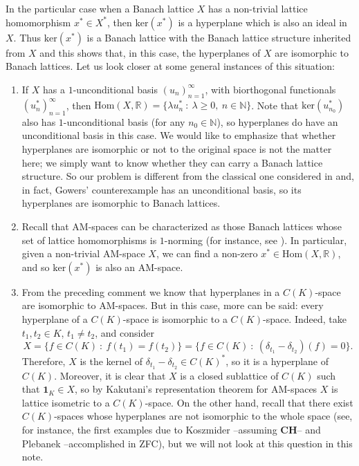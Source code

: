 \documentclass[11pt]{amsart}
\theoremstyle{definition}
\numberwithin{equation}{section}
\begin{document}
In the particular case when a Banach lattice $X$ has a non-trivial lattice homomorphism $x^*\in X^*$, then $\text{ker}(x^*)$ is a hyperplane which is also an ideal in $X$. Thus $\text{ker}(x^*)$ is a Banach lattice with the Banach lattice structure inherited from $X$ and this shows that, in this case, the hyperplanes of $X$ are isomorphic to Banach lattices. Let us look closer at some general instances of this situation:
\begin{enumerate}
    \item If $X$ has a $1$-unconditional basis $(u_n)_{n=1}^\infty$, with biorthogonal functionals $(u_n^*)_{n=1}^\infty$, then $\text{Hom}(X,\mathbb{R})=\{\lambda u_n^*\::\:\lambda\geq 0,\:n\in\mathbb{N}\}$. Note that $\text{ker}(u_{n_0}^*)$ also has $1$-unconditional basis (for any $n_0\in\mathbb{N}$), so hyperplanes do have an unconditional basis in this case. We would like to emphasize that whether hyperplanes are isomorphic or not to the original space is not the matter here; we simply want to know whether they can carry a Banach lattice structure. So our problem is different from the classical one considered in \cite{Gowers-hyperplane} and, in fact, Gowers' counterexample has an unconditional basis, so its hyperplanes are isomorphic to Banach lattices.

    
    \item Recall that AM-spaces can be characterized as those Banach lattices whose set of lattice homomorphisms is $1$-norming (for instance, see \cite[Proposition 5.4]{BGHMT}). In particular, given a non-trivial AM-space $X$, we can find a non-zero $x^*\in\text{Hom}(X,\mathbb{R})$, and so $\text{ker}(x^*)$ is also an AM-space.
    
    \item From the preceding comment we know that hyperplanes in a $C(K)$-space are isomorphic to AM-spaces. But in this case, more can be said: every hyperplane of a $C(K)$-space is isomorphic to a $C(K)$-space. Indeed, take $t_1,t_2\in K$, $t_1\neq t_2$, and consider
    $$
    X=\bigl\{f\in C(K)\::\: f(t_1)=f(t_2)\bigr\}=\bigl\{f\in C(K)\::\: (\delta_{t_1}-\delta_{t_2})(f)=0\bigr\}.
    $$
    Therefore, $X$ is the kernel of $\delta_{t_1}-\delta_{t_2}\in C(K)^*$, so it is a hyperplane of $C(K)$. Moreover, it is clear that $X$ is a closed sublattice of $C(K)$ such that $\mathbf{1}_K\in X$, so by Kakutani's representation theorem for AM-spaces $X$ is lattice isometric to a $C(K)$-space.
    On the other hand, recall that there exist $C(K)$-spaces whose hyperplanes are not isomorphic to the whole space (see, for instance, the first examples due to Koszmider \cite{Koszmider} --assuming \textbf{\textsf{CH}}-- and Plebanek \cite{Plebanek} --accomplished in ZFC), but we will not look at this question in this note.
\end{enumerate}
\end{document}
